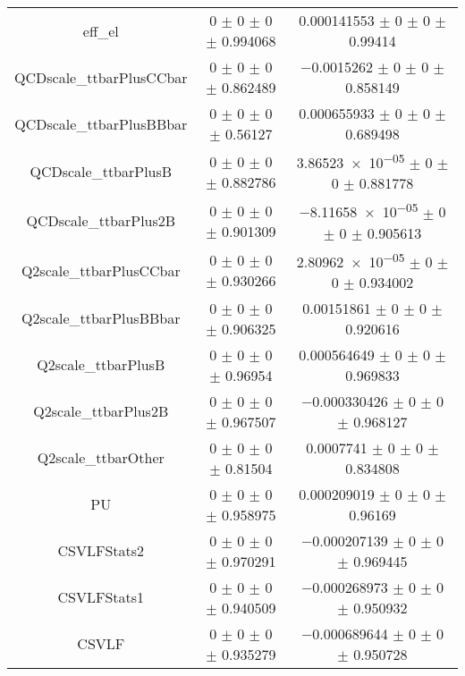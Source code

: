 \begin{table}
\begin{tabular}{ccc}
eff\_el 	& \num{0} $\pm$ \num{0} $\pm$ \num{0} $\pm$ \num{0.994068} 	& \num{0.000141553} $\pm$ \num{0} $\pm$ \num{0} $\pm$ \num{0.99414}\\
QCDscale\_ttbarPlusCCbar 	& \num{0} $\pm$ \num{0} $\pm$ \num{0} $\pm$ \num{0.862489} 	& \num{-0.0015262} $\pm$ \num{0} $\pm$ \num{0} $\pm$ \num{0.858149}\\
QCDscale\_ttbarPlusBBbar 	& \num{0} $\pm$ \num{0} $\pm$ \num{0} $\pm$ \num{0.56127} 	& \num{0.000655933} $\pm$ \num{0} $\pm$ \num{0} $\pm$ \num{0.689498}\\
QCDscale\_ttbarPlusB 	& \num{0} $\pm$ \num{0} $\pm$ \num{0} $\pm$ \num{0.882786} 	& \num{3.86523e-05} $\pm$ \num{0} $\pm$ \num{0} $\pm$ \num{0.881778}\\
QCDscale\_ttbarPlus2B 	& \num{0} $\pm$ \num{0} $\pm$ \num{0} $\pm$ \num{0.901309} 	& \num{-8.11658e-05} $\pm$ \num{0} $\pm$ \num{0} $\pm$ \num{0.905613}\\
Q2scale\_ttbarPlusCCbar 	& \num{0} $\pm$ \num{0} $\pm$ \num{0} $\pm$ \num{0.930266} 	& \num{2.80962e-05} $\pm$ \num{0} $\pm$ \num{0} $\pm$ \num{0.934002}\\
Q2scale\_ttbarPlusBBbar 	& \num{0} $\pm$ \num{0} $\pm$ \num{0} $\pm$ \num{0.906325} 	& \num{0.00151861} $\pm$ \num{0} $\pm$ \num{0} $\pm$ \num{0.920616}\\
Q2scale\_ttbarPlusB 	& \num{0} $\pm$ \num{0} $\pm$ \num{0} $\pm$ \num{0.96954} 	& \num{0.000564649} $\pm$ \num{0} $\pm$ \num{0} $\pm$ \num{0.969833}\\
Q2scale\_ttbarPlus2B 	& \num{0} $\pm$ \num{0} $\pm$ \num{0} $\pm$ \num{0.967507} 	& \num{-0.000330426} $\pm$ \num{0} $\pm$ \num{0} $\pm$ \num{0.968127}\\
Q2scale\_ttbarOther 	& \num{0} $\pm$ \num{0} $\pm$ \num{0} $\pm$ \num{0.81504} 	& \num{0.0007741} $\pm$ \num{0} $\pm$ \num{0} $\pm$ \num{0.834808}\\
PU 	& \num{0} $\pm$ \num{0} $\pm$ \num{0} $\pm$ \num{0.958975} 	& \num{0.000209019} $\pm$ \num{0} $\pm$ \num{0} $\pm$ \num{0.96169}\\
CSVLFStats2 	& \num{0} $\pm$ \num{0} $\pm$ \num{0} $\pm$ \num{0.970291} 	& \num{-0.000207139} $\pm$ \num{0} $\pm$ \num{0} $\pm$ \num{0.969445}\\
CSVLFStats1 	& \num{0} $\pm$ \num{0} $\pm$ \num{0} $\pm$ \num{0.940509} 	& \num{-0.000268973} $\pm$ \num{0} $\pm$ \num{0} $\pm$ \num{0.950932}\\
CSVLF 	& \num{0} $\pm$ \num{0} $\pm$ \num{0} $\pm$ \num{0.935279} 	& \num{-0.000689644} $\pm$ \num{0} $\pm$ \num{0} $\pm$ \num{0.950728}\\

\end{tabular}
\end{table}
